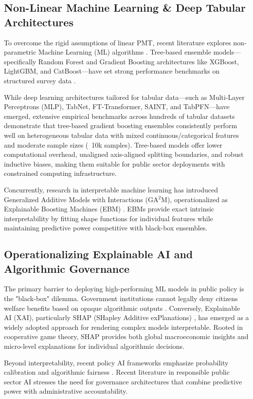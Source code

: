 \documentclass[conference]{IEEEtran}
\begin{document}
\subsection{Non-Linear Machine Learning & Deep Tabular Architectures}
To overcome the rigid assumptions of linear PMT, recent literature explores non-parametric Machine Learning (ML) algorithms \cite{b12, b13}. Tree-based ensemble models—specifically Random Forest and Gradient Boosting architectures like XGBoost, LightGBM, and CatBoost—have set strong performance benchmarks on structured survey data \cite{b7, b8}. 

While deep learning architectures tailored for tabular data—such as Multi-Layer Perceptrons (MLP), TabNet, FT-Transformer, SAINT, and TabPFN—have emerged, extensive empirical benchmarks across hundreds of tabular datasets \cite{b_tabular_dl} demonstrate that tree-based gradient boosting ensembles consistently perform well on heterogeneous tabular data with mixed continuous/categorical features and moderate sample sizes (~10k samples). Tree-based models offer lower computational overhead, unaligned axis-aligned splitting boundaries, and robust inductive biases, making them suitable for public sector deployments with constrained computing infrastructure.

Concurrently, research in interpretable machine learning has introduced Generalized Additive Models with Interactions (GA$^2$M), operationalized as Explainable Boosting Machines (EBM) \cite{b25}. EBMs provide exact intrinsic interpretability by fitting shape functions for individual features while maintaining predictive power competitive with black-box ensembles.

\subsection{Operationalizing Explainable AI and Algorithmic Governance}
The primary barrier to deploying high-performing ML models in public policy is the "black-box" dilemma. Government institutions cannot legally deny citizens welfare benefits based on opaque algorithmic outputs \cite{b5, b6}. Conversely, Explainable AI (XAI), particularly SHAP (SHapley Additive exPlanations) \cite{b14}, has emerged as a widely adopted approach for rendering complex models interpretable. Rooted in cooperative game theory, SHAP provides both global macroeconomic insights and micro-level explanations for individual algorithmic decisions.

Beyond interpretability, recent policy AI frameworks emphasize probability calibration \cite{b26, b30} and algorithmic fairness \cite{b27, b29}. Recent literature in responsible public sector AI \cite{b28} stresses the need for governance architectures that combine predictive power with administrative accountability.
\end{document}
